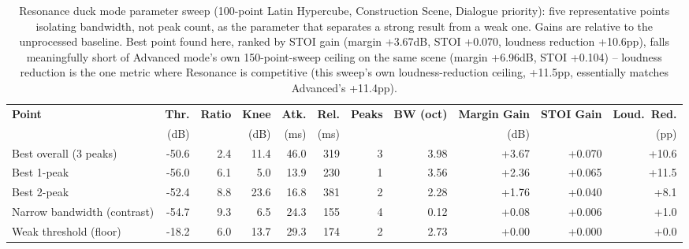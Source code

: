 
\begin{table}[h]
\centering
\tiny
\caption{Resonance duck mode parameter sweep (100-point Latin Hypercube,
Construction Scene, Dialogue priority): five representative points
isolating bandwidth, not peak count, as the parameter that separates a
strong result from a weak one. Gains are relative to the unprocessed
baseline. Best point found here, ranked by STOI gain (margin +3.67dB,
STOI +0.070, loudness reduction +10.6pp), falls meaningfully short of
Advanced mode's own 150-point-sweep ceiling on the same scene (margin
+6.96dB, STOI +0.104) -- loudness reduction is the one metric where
Resonance is competitive (this sweep's own loudness-reduction ceiling,
+11.5pp, essentially matches Advanced's +11.4pp).}
\label{tab:resonance-sweep}
\begin{tabular}{@{}l r r r r r r r r r r@{}}
\toprule
\cellcolor{paramgrey}\textbf{Point} & \cellcolor{paramgrey}\textbf{Thr.} & \cellcolor{paramgrey}\textbf{Ratio} & \cellcolor{paramgrey}\textbf{Knee} & \cellcolor{paramgrey}\textbf{Atk.} & \cellcolor{paramgrey}\textbf{Rel.} & \cellcolor{paramgrey}\textbf{Peaks} & \cellcolor{paramgrey}\textbf{BW (oct)} & \textbf{Margin Gain} & \textbf{STOI Gain} & \textbf{Loud.\ Red.} \\
 & \cellcolor{paramgrey}(dB) & \cellcolor{paramgrey}{} & \cellcolor{paramgrey}(dB) & \cellcolor{paramgrey}(ms) & \cellcolor{paramgrey}(ms) & \cellcolor{paramgrey}{} & \cellcolor{paramgrey}{} & (dB) & & (pp) \\
\midrule
Best overall (3 peaks)   & -50.6 & 2.4 & 11.4 & 46.0 & 319 & 3 & 3.98 & \cellcolor{green!70}+3.67 & \cellcolor{yellow!70}+0.070 & \cellcolor{orange!66}+10.6 \\
Best 1-peak              & -56.0 & 6.1 & 5.0  & 13.9 & 230 & 1 & 3.56 & \cellcolor{green!50}+2.36 & \cellcolor{yellow!66}+0.065 & \cellcolor{orange!70}+11.5 \\
Best 2-peak              & -52.4 & 8.8 & 23.6 & 16.8 & 381 & 2 & 2.28 & \cellcolor{green!41}+1.76 & \cellcolor{yellow!46}+0.040 & \cellcolor{orange!54}+8.1  \\
Narrow bandwidth (contrast) & -54.7 & 9.3 & 6.5  & 24.3 & 155 & 4 & 0.12 & \cellcolor{green!16}+0.08 & \cellcolor{yellow!20}+0.006 & \cellcolor{orange!20}+1.0  \\
Weak threshold (floor)   & -18.2 & 6.0 & 13.7 & 29.3 & 174 & 2 & 2.73 & \cellcolor{green!15}+0.00 & \cellcolor{yellow!15}+0.000 & \cellcolor{orange!15}+0.0  \\

\end{tabular}
\end{table}
